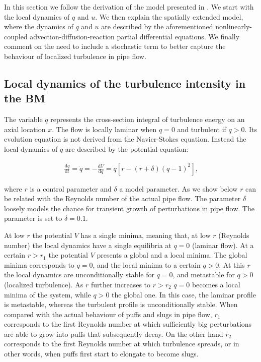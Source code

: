 \documentclass{article}
\begin{document}
In this section we follow the derivation of the model presented in \cite{barkley2016}. We start with the local dynamics of $q$ and $u$. We then explain the spatially extended model, where the dynamics of $q$ and $u$ are described by the aforementioned nonlinearly-coupled advection-diffusion-reaction partial differential equations. We finally comment on the need to include a stochastic term to better capture the behaviour of localized turbulence in pipe flow.





\subsection{Local dynamics of the turbulence intensity in the BM}
The variable $q$ represents the cross-section integral of turbulence energy on an axial location $x$. The flow is locally laminar when $q=0$ and turbulent if $q>0$. Its evolution equation is not derived from the Navier-Stokes equation. Instead the local dynamics of $q$ are described by the potential equation:

\begin{align}
\frac{\mathrm{d}q}{\mathrm{d}t}=\dot{q}= - \frac{\mathrm{d}V}{\mathrm{d}q}=q \left[r-\left(r+\delta \right) \left(q -1 \right)^{2} \right]\text{,}
\label{eq:loc_q_0}
\end{align}

where $r$ is a control parameter and $\delta$ a model parameter. As we show below $r$ can be related with the Reynolds number of the actual pipe flow. The parameter $\delta$ loosely models the chance for transient growth of perturbations in pipe flow. The parameter is set to $\delta=0.1$. 

At low $r$ the potential $V$ has a single minima, meaning that, at low $r$ (Reynolds number) the local dynamics have a single equilibria at $q=0$ (laminar flow). At a certain $r>r_{1}$ the potential $V$ presents a global and a local minima. The global minima corresponds to $q=0$, and the local minima to a certain $q>0$. At this $r$ the local dynamics are unconditionally stable for $q=0$, and metastable for $q>0$ (localized turbulence). As $r$ further increases to $r>r_{2}$ $q=0$ becomes a local minima of the system, while $q>0$ the global one. In this case, the laminar profile is metastable, whereas the turbulent profile is unconditionally stable. When compared with the actual behaviour of puffs and slugs in pipe flow, $r_{1}$ corresponds to the first Reynolds number at which sufficiently big perturbations are able to grow into puffs that subsequently decay. On the other hand $r_{2}$ corresponds to the first Reynolds number at which turbulence spreads, or in other words, when puffs first start to elongate to become slugs. 
\end{document}
